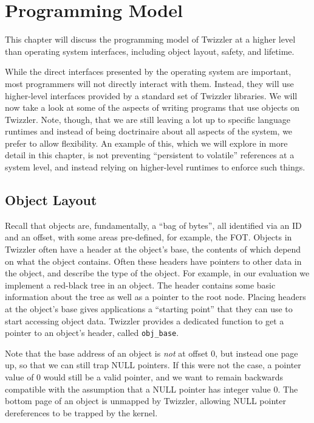 
\chapter{Programming Model}\label{ch:prog}

\begin{chabstract}
    This chapter will discuss the programming model of Twizzler at a higher level than operating system interfaces,
    including object layout, safety, and lifetime.
\end{chabstract}

While the direct interfaces presented by the operating system are important, most programmers will not directly interact
with them. Instead, they will use higher-level interfaces provided by a standard set of Twizzler libraries. We will now
take a look at some of the aspects of writing programs that use objects on Twizzler. Note, though, that we are still
leaving a lot up to specific language runtimes and instead of being doctrinaire about all aspects of the system, we
prefer to allow flexibility. An example of this, which we will explore in more detail in this chapter, is not
preventing ``persistent to volatile'' references at a system level, and instead relying on higher-level runtimes to
enforce such things.

\section{Object Layout}
Recall that objects are, fundamentally, a ``bag of bytes'', all identified via an ID and an offset, with some areas
pre-defined, for example, the FOT.
Objects in Twizzler often have a header at the object's base, the contents of which depend on what
the object contains. Often these headers have pointers to other data in the object, and describe the
type of the object. For example, in our evaluation we implement a red-black tree in an object. The
header contains some basic information about the tree as well as a pointer to the root node. Placing
headers at the object's base gives applications a ``starting point'' that they can use to start
accessing object data. Twizzler provides a dedicated function to get a pointer to an object's
header, called \texttt{obj\_base}.

Note that the base address of an object is \emph{not} at offset $0$, but instead one page up, so that we
can still trap NULL pointers. If this were not the case, a pointer value of $0$ would still be a valid
pointer, and we want to remain backwards compatible with the assumption that a NULL pointer has
integer value $0$. The bottom page of an object is unmapped by Twizzler, allowing NULL pointer
dereferences to be trapped by the kernel.

